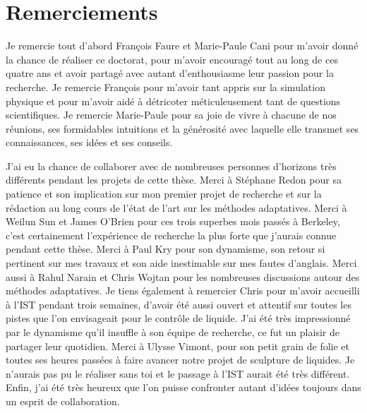 \chapter*[Remerciements]{Remerciements}

Je remercie tout d'abord François Faure et Marie-Paule Cani pour m'avoir donné la chance de réaliser ce doctorat, 
pour m'avoir encouragé tout au long de ces quatre ans et avoir partagé avec autant d'enthousiasme leur passion pour la recherche.
Je remercie François pour m'avoir tant appris sur la simulation physique et pour m'avoir aidé à détricoter méticuleusement tant de questions scientifiques.
Je remercie Marie-Paule pour sa joie de vivre à chacune de nos réunions, ses formidables intuitions et la générosité avec laquelle elle transmet ses connaissances, ses idées et ses conseils.

J'ai eu la chance de collaborer avec de nombreuses personnes d'horizons très différents pendant les projets de cette thèse.
Merci à Stéphane Redon pour sa patience et son implication sur mon premier projet de recherche et sur la rédaction au long cours de l'état de l'art sur les méthodes adaptatives. Merci à Weilun Sun et James O'Brien pour ces trois superbes mois passés à Berkeley, c'est certainement l'expérience de recherche la plus forte que j'aurais connue pendant cette thèse. Merci à Paul Kry pour son dynamisme, son retour si pertinent sur mes travaux et son aide inestimable sur mes fautes d'anglais. Merci aussi à Rahul Narain et Chris Wojtan pour les nombreuses discussions autour des méthodes adaptatives. Je tiens également à remercier Chris pour m'avoir accueilli à l'IST pendant trois semaines, d'avoir été aussi ouvert et attentif sur toutes les pistes que l'on envisageait pour le contrôle de liquide. J'ai été très impressionné par le dynamisme qu'il insuffle à son équipe de recherche, ce fut un plaisir de partager leur quotidien. Merci à Ulysse Vimont, pour son petit grain de folie et toutes ses heures passées à faire avancer notre projet de sculpture de liquides. Je n'aurais pas pu le réaliser sans toi et le passage à l'IST aurait été très différent. Enfin, j'ai été très heureux que l'on puisse confronter autant d'idées toujours dans un esprit de collaboration. 

